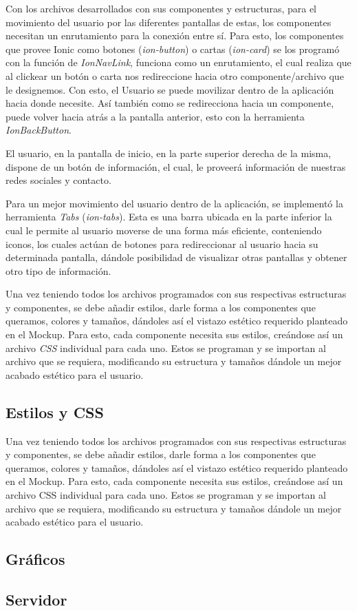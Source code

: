                             Con los archivos desarrollados con sus componentes y estructuras, para el movimiento del usuario por las diferentes pantallas de estas, los componentes necesitan un enrutamiento para la conexión entre sí. Para esto, los componentes que provee Ionic como botones (\textit{ion-button}) o cartas (\textit{ion-card}) se los programó con la función de \textit{IonNavLink}, funciona como un enrutamiento, el cual realiza que al clickear un botón o carta nos redireccione hacia otro componente/archivo que le designemos. Con esto, el Usuario se puede movilizar dentro de la aplicación hacia donde necesite. Así también como se redirecciona hacia un componente, puede volver hacia atrás a la pantalla anterior, esto con la herramienta \textit{IonBackButton}.\par
                El usuario, en la pantalla de inicio, en la parte superior derecha de la misma, dispone de un botón de información, el cual, le proveerá información de nuestras redes sociales y contacto.\par
                Para un mejor movimiento del usuario dentro de la aplicación, se implementó la herramienta \textit{Tabs} (\textit{ion-tabs}). Esta es una barra ubicada en la parte inferior la cual le permite al usuario moverse de una forma más eficiente, conteniendo iconos, los cuales actúan de botones para redireccionar al usuario hacia su determinada pantalla, dándole posibilidad de visualizar otras pantallas y obtener otro tipo de información.\par
                Una vez teniendo todos los archivos programados con sus respectivas estructuras y componentes, se debe añadir estilos, darle forma a los componentes que queramos, colores y tamaños, dándoles así el vistazo estético requerido planteado en el Mockup. Para esto, cada componente necesita sus estilos, creándose así un archivo \textit{CSS} individual para cada uno. Estos se programan y se importan al archivo que se requiera, modificando su estructura y tamaños dándole un mejor acabado estético para el usuario.\par
            \subsection{Estilos y CSS}
                Una vez teniendo todos los archivos programados con sus respectivas estructuras y componentes, se debe añadir estilos, darle forma a los componentes que queramos, colores y tamaños, dándoles así el vistazo estético requerido planteado en el Mockup. Para esto, cada componente necesita sus estilos, creándose así un archivo CSS individual para cada uno. Estos se programan y se importan al archivo que se requiera, modificando su estructura y tamaños dándole un mejor acabado estético para el usuario.\par
            \subsection{Gráficos}
            \subsection{Servidor}